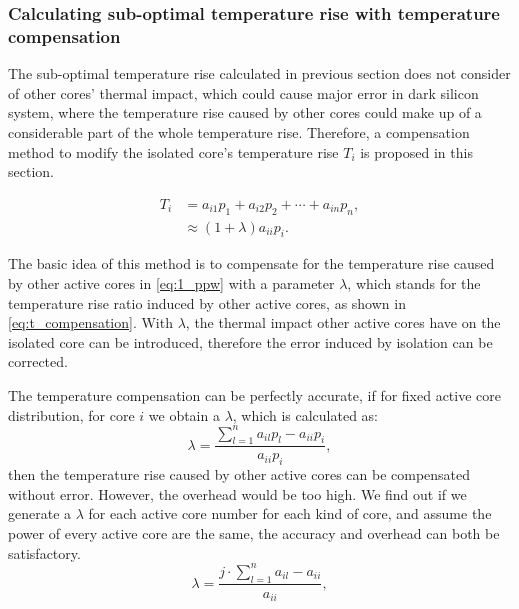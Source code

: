 \subsubsection{Calculating sub-optimal temperature rise with temperature compensation}
The sub-optimal temperature rise calculated in previous section does not consider of other cores' thermal impact, which could cause major error in dark silicon system, where the temperature rise caused by other cores could make up of a considerable part of the whole temperature rise. Therefore, a compensation method to modify the isolated core's temperature rise $T_{i}$ is proposed in this section.

\begin{equation}\label{eq:t_compensation}
\begin{split}
T_{i} &=a_{i1}p_{1} + a_{i2}p_{2} +\cdots + a_{in}p_{n},\\
&\approx(1+\lambda)a_{ii}p_{i}.
\end{split}
\end{equation}

The basic idea of this method is to compensate for the temperature rise caused by other active cores in \eqref{eq:1_ppw} with a parameter $\lambda$, which stands for the temperature rise ratio induced by other active cores, as shown in \eqref{eq:t_compensation}. With $\lambda$, the thermal impact other active cores have on the isolated core can be introduced, therefore the error induced by isolation can be corrected.

The temperature compensation can be perfectly accurate, if for fixed active core distribution, for core $i$ we obtain a $\lambda$, which is calculated as:
\begin{equation}\label{eq:lambda_accuracy}
\lambda =\frac{\sum_{l=1}^{n}a_{il}p_{l}-a_{ii}p_{i}}{a_{ii}p_{i}},
\end{equation}
then the temperature rise caused by other active cores can be compensated without error. However, the overhead would be too high. We find out if we generate a $\lambda$ for each active core number for each kind of core, and assume the power of every active core are the same, the accuracy and overhead can both be satisfactory.
\begin{equation}\label{eq:lambda}
\lambda =\frac{j \cdot \sum_{l=1}^{n}a_{il}-a_{ii}}{a_{ii}},
\end{equation}




